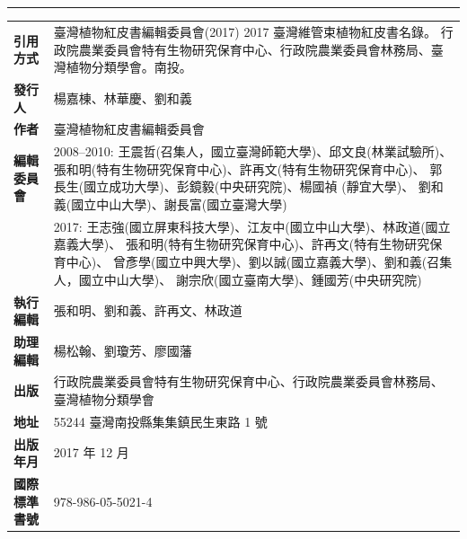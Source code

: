 \clearpage
\pagestyle{plain}
\thispagestyle{empty}
\linespread{1.5}
\noindent\huge \color{red}{2017 臺灣維管束植物紅皮書名錄} \\
\noindent\Large \color{red}{The Red List of Vascular Plants of Taiwan, 2017} \\
\normalsize
\hrule
\color{black}
\begin{table}[H]
  \scriptsize
  {\renewcommand\arraystretch{1.2}
  \begin{tabular}{>{\raggedleft\arraybackslash}p{3cm}p{10cm}}
      \textbf{引用方式}          & 臺灣植物紅皮書編輯委員會(2017) 
                                        2017 臺灣維管束植物紅皮書名錄。
                                        行政院農業委員會特有生物研究保育中心、行政院農業委員會林務局、臺灣植物分類學會。南投。\\
      \textbf{發行人}                 & 楊嘉棟、林華慶、劉和義 \\
      \textbf{作者}                   & 臺灣植物紅皮書編輯委員會 \\
      \textbf{編輯委員會}             & 2008--2010: 王震哲(召集人，國立臺灣師範大學)、邱文良(林業試驗所)、
                                        張和明(特有生物研究保育中心)、許再文(特有生物研究保育中心)、
                                        郭長生(國立成功大學)、彭鏡毅(中央研究院)、楊國禎 (靜宜大學)、
                                        劉和義(國立中山大學)、謝長富(國立臺灣大學) \\
                                      & 2017: 王志強(國立屏東科技大學)、江友中(國立中山大學)、林政道(國立嘉義大學)、
                                        張和明(特有生物研究保育中心)、許再文(特有生物研究保育中心)、
                                        曾彥學(國立中興大學)、劉以誠(國立嘉義大學)、劉和義(召集人，國立中山大學)、
                                        謝宗欣(國立臺南大學)、鍾國芳(中央研究院) \\
      \textbf{執行編輯}          & 張和明、劉和義、許再文、林政道 \\
      \textbf{助理編輯}          & 楊松翰、劉瓊芳、廖國藩 \\
      \textbf{出版}              & 行政院農業委員會特有生物研究保育中心、行政院農業委員會林務局、臺灣植物分類學會 \\
      \textbf{地址}              & 55244 臺灣南投縣集集鎮民生東路 1 號 \\
      \textbf{出版年月}          & 2017 年 12 月 \\
      \textbf{國際標準書號}              & 978-986-05-5021-4 \\

\end{tabular}}
\end{table}
